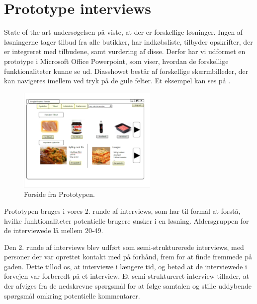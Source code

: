 \section{Prototype interviews}\label{section:interview2}
State of the art undersøgelsen på  viste, at der er forskellige løsninger.
Ingen af løsningerne tager tilbud fra alle butikker, har indkøbsliste, tilbyder opskrifter, der er integreret med tilbudene, samt vurdering af disse.
Derfor har vi udformet en prototype i Microsoft Office Powerpoint, som viser, hvordan de forskellige funktionaliteter kunne se ud.
Diasshowet består af forskellige skærmbilleder, der kan navigeres imellem ved tryk på de gule felter.
Et eksempel kan ses på .

\begin{figure}
\vspace{-25pt}
	\begin{center}
		\includegraphics[trim=0.3cm 1.5cm 1.3cm 1cm, clip=true,width=0.6\textwidth]{images/Images/prototype-forside.PNG}
	\end{center}
	\vspace{-20pt}
	\caption{Forside fra Prototypen.}\label{ss:Prototype}
	\vspace{-30pt}
\end{figure}

Prototypen bruges i vores 2. runde af interviews, som har til formål at forstå, hvilke funktionaliteter potentielle brugere ønsker i en løsning.
Aldersgruppen for de interviewede lå mellem 20-49.

Den 2. runde af interviews blev udført som semi-strukturerede interviews, med personer der var oprettet kontakt med på forhånd, frem for at finde fremmede på gaden.
Dette tillod os, at interviewe i længere tid, og betød at de interviewede i forvejen var forberedt på et interview.
Et semi-struktureret interview tillader, at der afviges fra de nedskrevne spørgsmål for at følge samtalen og stille uddybende spørgsmål omkring potentielle kommentarer.\cite[s. 142-146]{DIS2014}
 
